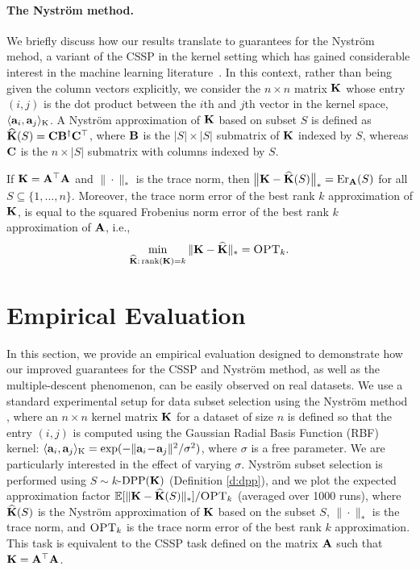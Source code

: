 \documentclass{article}
\begin{document}
  \paragraph{The Nystr\"om method.} 
  We briefly discuss how our results translate to guarantees for the Nystr\"om
  mehod, a variant of the CSSP in the kernel setting which has
  gained considerable interest in the machine learning literature~\citep{dm_kernel_JRNL,revisiting-nystrom}.
In this context, rather than being given the column vectors
explicitly, we consider the 
$n\times n$ matrix $\mathbf K$ whose entry $(i,j)$ is the dot product
between the $i$th and $j$th vector in the kernel space,
$\langle\mathbf a_i,\mathbf a_j\rangle_\text{K}$. A Nystr\"om approximation of $\mathbf K$ based on subset $S$
is defined as ${\widehat{\mathbf K}}(S) = \mathbf C\mathbf B^{\dagger}\mathbf C^\top$, where $\mathbf B$ is the
$|S|\times |S|$ submatrix of $\mathbf K$ indexed by $S$, whereas $\mathbf C$ is the
$n\times |S|$  submatrix with columns indexed by $S$. 
\begin{remark}
  If $\mathbf K=\mathbf A^\top\mathbf A$ and $\|\cdot\|_*$ is the trace norm, then
    $\big\|\mathbf K-{\widehat{\mathbf K}}(S)\big\|_* = \mathrm{Er}_{\mathbf A}(S)$ for all $S\subseteq\{1,...,n\}$.
Moreover, the trace norm error of the best rank $k$ approximation of
$\mathbf K$, 
is equal to the squared Frobenius norm error of the 
best rank $k$ approximation of $\mathbf A$, i.e.,
\[\min_{{\widehat{\mathbf K}}:\,\mathrm{rank}(\mathbf K)=k}\|\mathbf K-{\widehat{\mathbf K}}\|_* = {\textsc{OPT}_k}.\]
\end{remark}

\section{Empirical Evaluation}
\label{s:experiments}


In this section, we provide an empirical evaluation designed to demonstrate how our improved guarantees for the CSSP and Nystr\"om method, as well as the multiple-descent phenomenon, can be easily observed on real datasets. 
We use a standard experimental setup for data subset selection using
the Nystr\"om method \citep{revisiting-nystrom}, where an $n\times n$
kernel matrix $\mathbf K$ for a dataset of size $n$ is defined so that the
entry $(i,j)$ is computed using the Gaussian Radial Basis Function  (RBF)
kernel:
$\langle\mathbf a_i,\mathbf a_j\rangle_\text{K}=\exp(-\|\mathbf a_i\!-\!\mathbf a_j\|^2/\sigma^2)$,
where $\sigma$ is a free parameter. 
We are particularly interested in the effect of varying $\sigma$.
Nystr\"om subset selection is performed using $S\sim k$-${\mathrm{DPP}}(\mathbf K)$
(Definition \ref{d:dpp}), and we plot the expected approximation
factor $\mathbb E[\|\mathbf K-{\widehat{\mathbf K}}(S)\|_*]/{\textsc{OPT}_k}$ (averaged over 1000 runs), where
${\widehat{\mathbf K}}(S)$ is the Nystr\"om approximation of $\mathbf K$ based on the subset
$S$, $\|\cdot\|_*$ is the trace norm,
and ${\textsc{OPT}_k}$ is the trace norm error of the best rank $k$
approximation. 
This task is
equivalent to the CSSP task defined on the matrix $\mathbf A$ such that
$\mathbf K=\mathbf A^\top\mathbf A$. 
\end{document}
